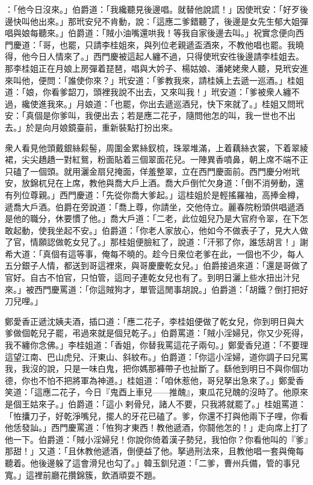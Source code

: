 ：「他今日沒來。」伯爵道：「我纔聽見後邊唱。就替他說謊！」因使玳安：「好歹後邊快叫他出來。」那玳安兒不肯動，說：「這應二爹錯聽了，後邊是女先生郁大姐彈唱與娘每聽來。」伯爵道：「賊小油嘴還哄我！等我自家後邊去叫。」祝實念便向西門慶道：「哥，也罷，只請李桂姐來，與列位老親遞盃酒來，不教他唱也罷。我曉得，他今日人情來了。」西門慶被這起人纏不過，只得使玳安徃後邊請李桂姐去。那李桂姐正在月娘上房彈着琵琶，唱與大妗子、楊姑娘、潘姥姥衆人聽，見玳安進來叫他，便問：「誰使你來？」玳安道：「爹教我來，請桂姨上去遞一巡酒。」桂姐道：「娘，你看爹韶刀，頭裡我說不出去，又來叫我！」玳安道：「爹被衆人纏不過，纔使進我來。」月娘道：「也罷，你出去遞巡酒兒，快下來就了。」桂姐又問玳安：「真個是你爹叫，我便出去；若是應二花子，隨問他怎的叫，我一世也不出去。」於是向月娘鏡臺前，重新裝點打扮出來。

衆人看見他頭戴銀絲鬏髻，周圍金累絲釵梳，珠翠堆滿，上着藕絲衣裳，下着翠綾裙，尖尖趫趫一對紅鴛，粉面貼着三個翠面花兒。一陣異香噴鼻，朝上席不端不正只磕了一個頭。就用灑金扇兒掩面，佯羞整翠，立在西門慶面前。西門慶分咐玳安，放錦杌兒在上席，教他與喬大戶上酒。喬大戶倒忙欠身道：「倒不消勞動，還有列位尊親。」西門慶道：「先從你喬大爹起。」這桂姐於是輕搖羅袖，高捧金樽，遞喬大戶酒。伯爵在旁說道：「喬上尊，你請坐，交他侍立。麗春院粉頭供唱遞酒是他的職分，休要慣了他。」喬大戶道：「二老，此位姐兒乃是大官府令翠，在下怎敢起動，使我坐起不安。」伯爵道：「你老人家放心，他如今不做表子了，見大人做了官，情願認做乾女兒了。」那桂姐便臉紅了，說道：「汗邪了你，誰恁胡言！」謝希大道：「真個有這等事，俺每不曉的。趁今日衆位老爹在此，一個也不少，每人五分銀子人情，都送到哥這裡來，與哥慶慶乾女兒。」{}伯爵接過來道：「還是哥做了官好。自古不怕官，只怕管，這囘子連乾女兒也有了。到明日灑上些水扭出汁兒來。」被西門慶罵道：「你這賊狗才，單管這閒事胡說。」伯爵道：「胡鐵？倒打把好刀兒哩。」

鄭愛香正遞沈姨夫酒，插口道：「應二花子，李桂姐便做了乾女兒，你到明日與大爹做個乾兒子罷，弔過來就是個兒乾子。」伯爵罵道：「賊小淫婦兒，你又少死得，我不纏你念佛。」李桂姐道：「香姐，你替我罵這花子兩句。」鄭愛香兒道：「不要理這望江南、巴山虎兒、汗東山、斜紋布。」{}伯爵道：「你這小淫婦，道你調子曰兒罵我，我沒的說，只是一味白鬼，把你媽那褲帶子也扯斷了。繇他到明日不與你個功德，你也不怕不把將軍為神道。」桂姐道：「咱休惹他，哥兒拏出急來了。」鄭愛香笑道：「這應二花子，今日『鬼酉上車兒——推醜』，東瓜花兒醜的沒時了。他原來是個王姑來子。」伯爵道：「這小𢱉剌骨兒，諸人不要，只我將就罷了。」桂姐罵道：「恠攮刀子，好乾淨嘴兒，擺人的牙花已磕了。爹，你還不打與他兩下子哩，你看他恁發訕。」西門慶罵道：「恠狗才東西！教他遞酒，你鬪他怎的！」走向席上打了他一下。伯爵道：「賊小淫婦兒！你說你倚着漢子勢兒，我怕你？你看他叫的『爹』那甜！」又道：「且休教他遞酒，倒便益了他。拏過刑法來，且教他唱一套與俺每聽着。他後邊躲了這會滑兒也勾了。」韓玉釧兒道：「二爹，曹州兵備，管的事兒寬。」這裡前廳花攢錦簇，飲酒頑耍不題。

